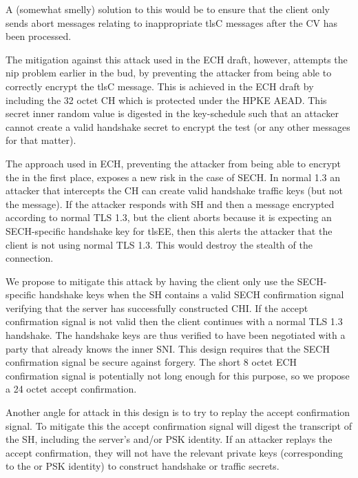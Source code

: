 A (somewhat smelly) solution to this would be
to ensure that the client only sends abort
messages relating to inappropriate \ac{tlsC} messages after the \ac{CV} has been processed.

The mitigation against this attack used in the \ac{ECH} draft, however, attempts the nip problem earlier in the bud, by preventing the attacker from being able to correctly encrypt the \ac{tlsC} message.
This is achieved in the \ac{ECH}  draft by including the 32 octet
\ac{CH} which is protected under the \ac{HPKE} \ac{AEAD}.
This secret inner random value is digested in the key-schedule such that an attacker cannot
create a valid handshake secret to encrypt the test  (or any other messages for that matter).

The approach used in \ac{ECH}, preventing the attacker
from being able to encrypt the 
in the first place,
exposes a new risk in the case of \ac{SECH}.
In normal  1.3 an attacker that intercepts the \ac{CH}
can
create valid handshake traffic keys (but not the  message).
If the attacker responds with \ac{SH} and then a 
message encrypted according to normal \ac{TLS} 1.3,
but the client aborts because it is expecting an \ac{SECH}-specific
handshake key for \ac{tlsEE},
then this alerts the attacker that the client is not using normal \ac{TLS} 1.3.
This would destroy the stealth of the connection.

We propose to mitigate this attack
by having the client only use the
\ac{SECH}-specific handshake keys when the \ac{SH}
contains a valid \ac{SECH} confirmation signal verifying
that the server has successfully constructed \ac{CHI}.
If the accept confirmation signal is not valid then the client continues with a normal \ac{TLS} 1.3 handshake.
The handshake keys are thus verified to have been negotiated
with a party that already knows the inner \ac{SNI}.
This design requires that the \ac{SECH} confirmation
signal be secure against forgery.
The short 8 octet \ac{ECH} confirmation signal is potentially
not long enough for this purpose,
so we propose a 24 octet accept confirmation.

Another angle for attack in this design is to try to replay the accept confirmation signal.
To mitigate this the accept confirmation signal
will digest the transcript of the \ac{SH},
including the server's  and/or \ac{PSK} identity.
If an attacker replays the accept confirmation, they will not have the relevant private keys (corresponding to the  or \ac{PSK} identity)
to construct handshake or traffic secrets.

